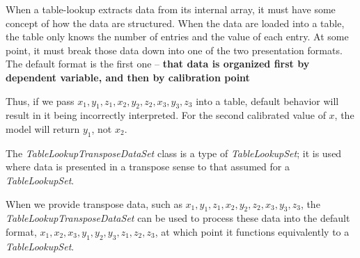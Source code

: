 \documentclass[11pt,fleqn]{report}
\begin{document}
When a table-lookup extracts data from its internal array, it must have some
concept of how the data are structured.  When the data are loaded into a
table, the table only knows the number of entries and the value of each
entry.  At some point, it must break those data down into one of the two
presentation formats.  The default format is the first one -- \textbf{that
data is organized first by dependent variable, and then by calibration point}

Thus, if we pass ${x_1, y_1, z_1, x_2, y_2, z_2, x_3, y_3, z_3}$ into a
table, default behavior will result in it being incorrectly interpreted.
For the second calibrated value
of $x$, the model will return $y_1$, not $x_2$.

The \textit{TableLookupTransposeDataSet} class is a type of
\textit{TableLookupSet}; it is used where data is presented in a transpose
sense to that assumed for a \textit{TableLookupSet}.

When we provide transpose data, such as
${x_1, y_1, z_1, x_2, y_2, z_2, x_3, y_3, z_3}$,
the \textit{TableLookupTransposeDataSet} can be used to process
these data into the default format,
${x_1, x_2, x_3, y_1, y_2, y_3, z_1, z_2, z_3}$,
at which point it functions
equivalently to a \textit{TableLookupSet}.
\end{document}
